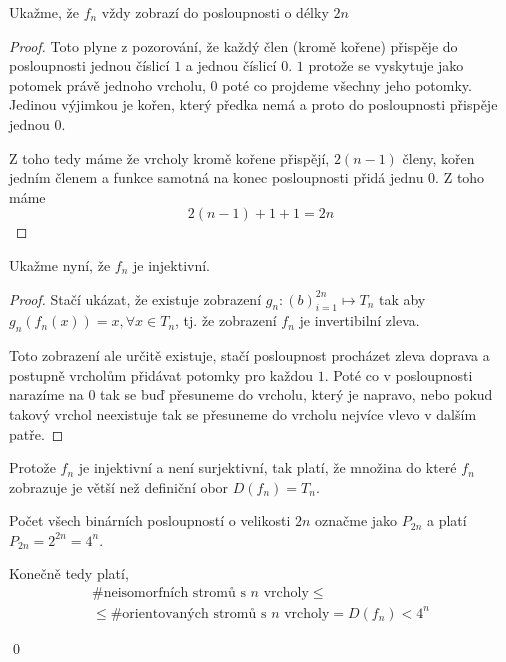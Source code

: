 \documentclass[../main.tex]{subfiles}
\begin{document}
Ukažme, že $f_n$ vždy zobrazí do posloupnosti o délky $2n$
\begin{proof}
    Toto plyne z pozorování, že každý člen (kromě kořene) přispěje do posloupnosti 
    jednou číslicí $1$ a jednou číslicí $0$. $1$ protože se vyskytuje jako potomek právě jednoho vrcholu, $0$ poté co projdeme všechny jeho potomky. 
    Jedinou výjimkou je kořen, který předka nemá a proto do posloupnosti přispěje jednou $0$.

    Z toho tedy máme že vrcholy kromě kořene přispějí, $2(n-1)$ členy, kořen jedním členem a funkce samotná na konec posloupnosti přidá jednu 0. Z toho máme \begin{equation*}
        2(n-1) + 1 + 1 = 2n 
    \end{equation*}
\end{proof}

Ukažme nyní, že $f_n$ je injektivní.

\begin{proof}
    Stačí ukázat, že existuje zobrazení $g_n: (b)_{i=1}^{2n} \mapsto T_n$ tak aby $g_n(f_n(x)) = x, \forall x \in T_n$, tj. že zobrazení $f_n$ je invertibilní zleva.

    Toto zobrazení ale určitě existuje, stačí posloupnost procházet zleva doprava a postupně vrcholům přidávat potomky 
    pro každou $1$. Poté co v posloupnosti narazíme na $0$ tak se buď přesuneme do vrcholu, který je napravo, 
    nebo pokud takový vrchol neexistuje tak se přesuneme do vrcholu nejvíce vlevo v dalším patře.
\end{proof}


Protože $f_n$ je injektivní a není surjektivní, tak platí, že množina do které $f_n$ zobrazuje je větší než definiční obor $D(f_n) = T_n$.

Počet všech binárních posloupností o velikosti $2n$ označme jako $P_{2n}$ a platí  $P_{2n} = 2^{2n} = 4^n$.


Konečně tedy platí,
\begin{multline*}
\# \text{neisomorfních stromů s }n\text{ vrcholy} \leq\\\leq \# \text{orientovaných stromů s }n\text{ vrcholy} = D(f_n) < 4^n
\end{multline*}

\qed



\end{document}
